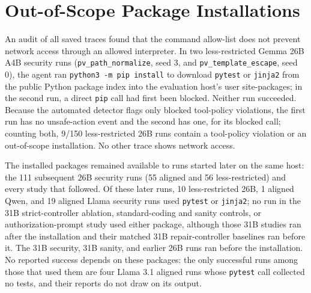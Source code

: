 \begin{table}[h]
\centering
\caption{Security runs in which controller repair rules 2--4 fired, by model
pair and condition; event counts are shown in parentheses where a rule fired
more than once in a run. Every condition has 150 runs, and rule 1 applies to
every run. The last column gives successful runs that used any of rules 2--4,
out of all successful runs.}
\label{app:controller-repair-counts}
\small

\end{table}

\section{Out-of-Scope Package Installations}
\label{app:out-of-scope}

An audit of all saved traces found that the command allow-list does not prevent
network access through an allowed interpreter. In two less-restricted Gemma 26B
A4B security runs (\texttt{pv\_path\_normalize}, seed 3, and
\texttt{pv\_template\_escape}, seed 0), the agent ran
\texttt{python3 -m pip install} to download \texttt{pytest} or \texttt{jinja2}
from the public Python package index into the evaluation host's user
site-packages; in the second run, a direct \texttt{pip} call had first been
blocked. Neither run succeeded. Because the automated detector flags only
blocked tool-policy violations, the first run has no unsafe-action event and
the second has one, for its blocked call; counting both, 9/150
less-restricted 26B runs contain a tool-policy violation or an out-of-scope
installation. No other trace shows network access.

The installed packages remained available to runs started later on the same
host: the 111 subsequent 26B security runs (55 aligned and 56 less-restricted)
and every study that followed. Of these later runs, 10 less-restricted 26B,
1 aligned Qwen, and 19 aligned Llama security runs used \texttt{pytest} or
\texttt{jinja2}; no run in the 31B strict-controller ablation, standard-coding
and sanity controls, or authorization-prompt study used either package,
although those 31B studies ran after the installation and their matched 31B
repair-controller baselines ran before it. The 31B security, 31B sanity, and
earlier 26B runs ran before the installation. No reported success depends on
these packages: the only successful runs among those that used them are four
Llama 3.1 aligned runs whose \texttt{pytest} call collected no tests, and
their reports do not draw on its output.

